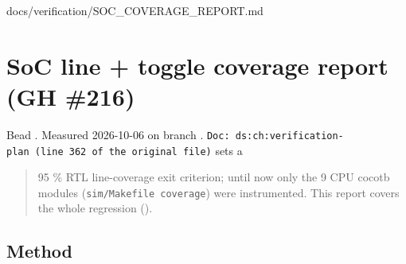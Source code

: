 \begin{relocated}{docs/verification/SOC_COVERAGE_REPORT.md}
\section{SoC line + toggle coverage report (GH \#216)}\label{tm:flow:soc-coverage-report}

Bead . Measured 2026-10-06 on branch
.
\texttt{Doc:\allowbreak{}\ ds:\allowbreak{}ch:\allowbreak{}verification-\allowbreak{}plan\ (line\ 362\ of\ the\ original\ file)}
sets a

\begin{quote}
95 \% RTL line-coverage exit criterion; until now only the 9 CPU cocotb
modules (\texttt{sim/\allowbreak{}Makefile\ coverage}) were
instrumented. This report covers the whole 
regression ().
\end{quote}

\subsection{Method}\label{tm:flow:soc-coverage-report:method}


\end{relocated}

